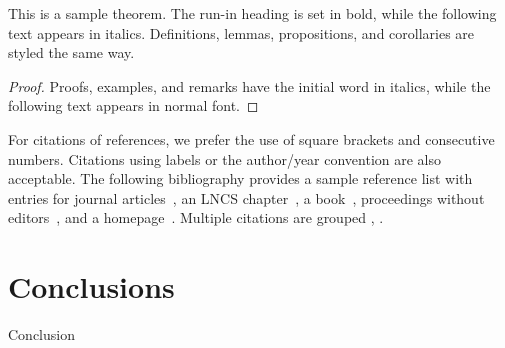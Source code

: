 \documentclass[runningheads]{llncs}
\begin{document}
\begin{theorem}
This is a sample theorem. The run-in heading is set in bold, while
the following text appears in italics. Definitions, lemmas,
propositions, and corollaries are styled the same way.
\end{theorem}
%
%
\begin{proof}
Proofs, examples, and remarks have the initial word in italics,
while the following text appears in normal font.
\end{proof}
For citations of references, we prefer the use of square brackets
and consecutive numbers. Citations using labels or the author/year
convention are also acceptable. The following bibliography provides
a sample reference list with entries for journal
articles~\cite{ref_article1}, an LNCS chapter~\cite{ref_lncs1}, a
book~\cite{ref_book1}, proceedings without editors~\cite{ref_proc1},
and a homepage~\cite{ref_url1}. Multiple citations are grouped
\cite{ref_article1,ref_lncs1,ref_book1},
\cite{ref_article1,ref_book1,ref_proc1,ref_url1}.
\section{Conclusions}
Conclusion
%
%
%


%
\end{document}
